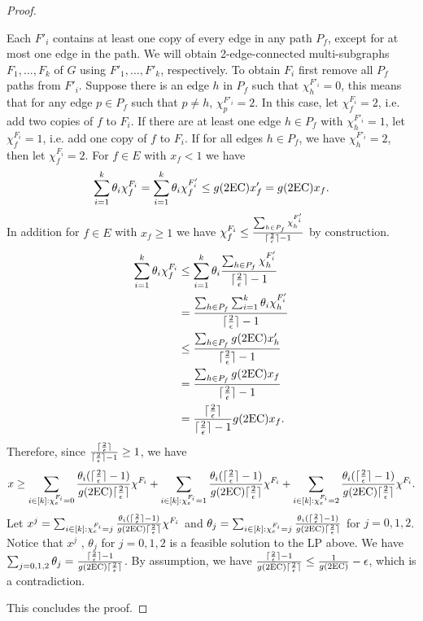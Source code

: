 \begin{proof}
\begin{cproof}
		Each $F'_i$ contains at least one copy of every edge in any path $P_f$, except for at most one edge in the path. We will obtain 2-edge-connected multi-subgraphs $F_1,\ldots,F_k$ of $G$ using $F'_1,\ldots,F'_k$, respectively. To obtain $F_i$ first remove all $P_f$ paths from $F'_i$. Suppose there is an edge $h$ in $P_f$ such that $\chi^{F'_i}_h=0$, this means that for any edge $p\in P_f$ such that $p\neq h$, $\chi^{F'_i}_p=2$. In this case, let $\chi^{F_i}_f=2$, i.e. add two copies of $f$ to $F_i$. If there are at least one edge $h\in P_f$ with $\chi^{F'_i}_h= 1$, let $\chi^{F_i}_f=1$, i.e. add one copy of $f$ to $F_i$. If for all edges $h\in P_f$, we have $\chi^{F'_i}_h=2$, then let $\chi^{F_i}_f=2$. For $f\in E$ with $x_f<1$ we have
		\begin{equation}
		\sum_{i=1}^{k}\theta_i \chi^{F_i}_f=\sum_{i=1}^{k}\theta_i \chi^{F'_i}_f\leq g(\2ec)x'_f= g(\2ec)x_f.
		\end{equation}
		In addition for $f\in E$ with $x_f\geq 1$ we have $\chi^{F_i}_f \leq \frac{\sum_{h\in P_f}\chi^{F'_i}_h}{\lceil\frac{2}{\epsilon}\rceil-1}$ by construction.
		\begin{align*}
		\sum_{i=1}^{k}\theta_i \chi^{F_i}_f&\leq \sum_{i=1}^{k}\theta_i\frac{\sum_{h\in P_f}\chi^{F'_i}_h}{\ceil{\frac{2}{\epsilon}}-1}\\
		&= \frac{\sum_{h\in P_f} \sum_{i=1}^{k}\theta_i\chi^{F'_i}_h}{\ceil{\frac{2}{\epsilon}}-1}\\
		&\leq \frac{\sum_{h\in P_f} g(\2ec)x'_h}{\ceil{\frac{2}{\epsilon}}-1}\\
		&= \frac{\sum_{h\in P_f} g(\2ec)x_f}{\ceil{\frac{2}{\epsilon}}-1}\\
		&= \frac{\ceil{\frac{2}{\epsilon}}}{\ceil{\frac{2}{\epsilon}}-1}g(\2ec)x_f.
		\end{align*}
		Therefore, since $\frac{\lceil\frac{2}{\epsilon}\rceil}{\lceil\frac{2}{\epsilon}\rceil-1}\geq 1$, we have 
		\begin{equation}
		x \geq\sum_{i\in [k]: \chi^{F_i}_e=0}\frac{\theta_i(\ceil{\frac{2}{\epsilon}}-1)}{g(\2ec)\ceil{\frac{2}{\epsilon}}}\chi^{F_i}+ \sum_{i\in [k]: \chi^{F_i}_e=1}\frac{\theta_i(\ceil{\frac{2}{\epsilon}}-1)}{g(\2ec)\ceil{\frac{2}{\epsilon}}}\chi^{F_i}+\sum_{i\in [k]: \chi^{F_i}_e=2}\frac{\theta_i(\ceil{\frac{2}{\epsilon}}-1)}{g(\2ec)\ceil{\frac{2}{\epsilon}}}\chi^{F_i}.
		\end{equation}
		Let $x^j = \sum_{i\in [k]: \chi^{F_i}_e=j}\frac{\theta_i(\ceil{\frac{2}{\epsilon}}-1)}{g(\2ec)\ceil{\frac{2}{\epsilon}}}\chi^{F_i}$ and $\theta_j =  \sum_{i\in [k]: \chi^{F_i}_e=j}\frac{\theta_i(\ceil{\frac{2}{\epsilon}}-1)}{g(\2ec)\ceil{\frac{2}{\epsilon}}}$ for $j=0,1,2$. Notice that  $x^j$ , $\theta_j$ for $j=0,1,2$ is a feasible solution to the LP above. We have $\sum_{j=0,1,2}\theta_j = \frac{\ceil{\frac{2}{\epsilon}}-1}{g(\2ec)\ceil{\frac{2}{\epsilon}}}$. By assumption, we have $\frac{\ceil{\frac{2}{\epsilon}}-1}{g(\2ec)\ceil{\frac{2}{\epsilon}}}\leq  \frac{1}{g(\2ec)}-\epsilon$, which is a contradiction.
	\end{cproof}
	This concludes the proof. \end{proof}
